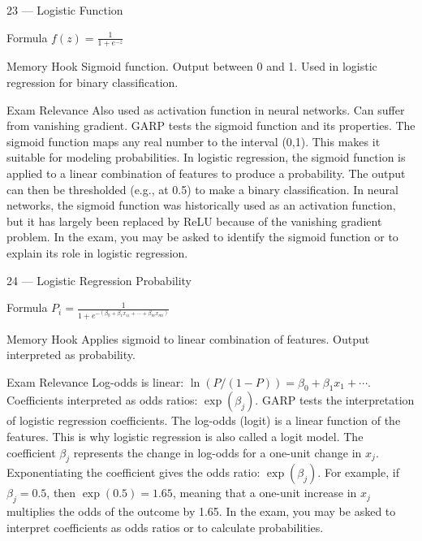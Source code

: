 \documentclass[aspectratio=169,8pt]{beamer}
\begin{document}
	\begin{frame}{23 --- Logistic Function}
		\begin{block}{Formula}
			$f(z) = \frac{1}{1 + e^{-z}}$
		\end{block}
		\begin{block}{Memory Hook}
			Sigmoid function. Output between 0 and 1. Used in logistic regression for binary classification.
		\end{block}
		\begin{block}{Exam Relevance}
			Also used as activation function in neural networks. Can suffer from vanishing gradient. GARP tests the sigmoid function and its properties. The sigmoid function maps any real number to the interval (0,1). This makes it suitable for modeling probabilities. In logistic regression, the sigmoid function is applied to a linear combination of features to produce a probability. The output can then be thresholded (e.g., at 0.5) to make a binary classification. In neural networks, the sigmoid function was historically used as an activation function, but it has largely been replaced by ReLU because of the vanishing gradient problem. In the exam, you may be asked to identify the sigmoid function or to explain its role in logistic regression.
		\end{block}
	\end{frame}
	
	\begin{frame}{24 --- Logistic Regression Probability}
		\begin{block}{Formula}
			$P_i = \frac{1}{1 + e^{-(\beta_0 + \beta_1 x_{1i} + \cdots + \beta_m x_{mi})}}$
		\end{block}
		\begin{block}{Memory Hook}
			Applies sigmoid to linear combination of features. Output interpreted as probability.
		\end{block}
		\begin{block}{Exam Relevance}
			Log-odds is linear: $\ln(P/(1-P)) = \beta_0 + \beta_1 x_1 + \cdots$. Coefficients interpreted as odds ratios: $\exp(\beta_j)$. GARP tests the interpretation of logistic regression coefficients. The log-odds (logit) is a linear function of the features. This is why logistic regression is also called a logit model. The coefficient $\beta_j$ represents the change in log-odds for a one-unit change in $x_j$. Exponentiating the coefficient gives the odds ratio: $\exp(\beta_j)$. For example, if $\beta_j = 0.5$, then $\exp(0.5) = 1.65$, meaning that a one-unit increase in $x_j$ multiplies the odds of the outcome by 1.65. In the exam, you may be asked to interpret coefficients as odds ratios or to calculate probabilities.
		\end{block}
	\end{frame}
	
\end{document}
